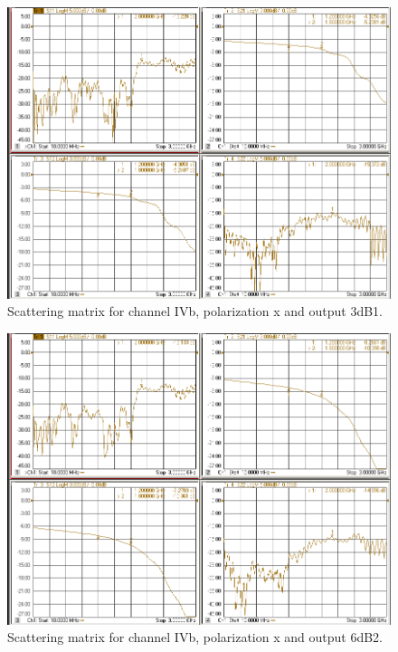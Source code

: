 \documentclass[12pt,a4paper,oneside]{article}
\begin{document}
\begin{figure}[H]
\centering
\includegraphics[width=0.9\linewidth]{VNA_results/IVbx_3dB1.png}
\caption{Scattering matrix for channel IVb, polarization x and output 3dB1.}
\label{fig:IVbx_3dB1}
\end{figure}


\begin{figure}[H]
\centering
\includegraphics[width=0.9\linewidth]{VNA_results/IVbx_6dB2.png}
\caption{Scattering matrix for channel IVb, polarization x and output 6dB2.}
\label{fig:IVbx_6dB2}
\end{figure}
\end{document}
